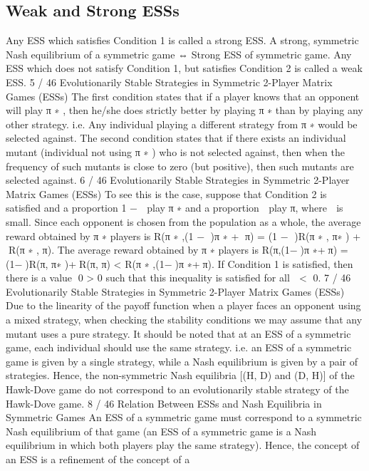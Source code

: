 \documentclass[]{report}
\begin{document}
\subsection{Weak and Strong ESSs}
Any ESS which satisfies Condition 1 is called a strong ESS.
A strong, symmetric Nash equilibrium of a symmetric game ⇔
Strong ESS of symmetric game.
Any ESS which does not satisfy Condition 1, but satisfies
Condition 2 is called a weak ESS.
5 / 46
Evolutionarily Stable Strategies in Symmetric 2-Player
Matrix Games (ESSs)
The first condition states that if a player knows that an opponent
will play π
∗
, then he/she does strictly better by playing π
∗
than by
playing any other strategy.
i.e. Any individual playing a different strategy from π
∗ would be
selected against.
The second condition states that if there exists an individual
mutant (individual not using π
∗
) who is not selected against, then
when the frequency of such mutants is close to zero (but positive),
then such mutants are selected against.
6 / 46
Evolutionarily Stable Strategies in Symmetric 2-Player
Matrix Games (ESSs)
To see this is the case, suppose that Condition 2 is satisfied and a
proportion 1 −  play π
∗
and a proportion  play π, where  is small.
Since each opponent is chosen from the population as a whole, the
average reward obtained by π
∗ players is
R(π
∗
,(1 − )π
∗ + π) = (1 − )R(π
∗
, π∗
) + R(π
∗
, π).
The average reward obtained by π
∗ players is
R(π,(1−)π
∗+π) = (1−)R(π, π∗
)+R(π, π) < R(π
∗
,(1−)π
∗+π).
If Condition 1 is satisfied, then there is a value 0 > 0 such that
this inequality is satisfied for all  < 0.
7 / 46
Evolutionarily Stable Strategies in Symmetric 2-Player
Matrix Games (ESSs)
Due to the linearity of the payoff function when a player faces an
opponent using a mixed strategy, when checking the stability
conditions we may assume that any mutant uses a pure strategy.
It should be noted that at an ESS of a symmetric game, each
individual should use the same strategy.
i.e. an ESS of a symmetric game is given by a single strategy,
while a Nash equilibrium is given by a pair of strategies.
Hence, the non-symmetric Nash equilibria [(H, D) and (D, H)] of
the Hawk-Dove game do not correspond to an evolutionarily stable
strategy of the Hawk-Dove game.
8 / 46
Relation Between ESSs and Nash Equilibria in Symmetric
Games
An ESS of a symmetric game must correspond to a symmetric
Nash equilibrium of that game (an ESS of a symmetric game is a
Nash equilibrium in which both players play the same strategy).
Hence, the concept of an ESS is a refinement of the concept of a
\end{document}
